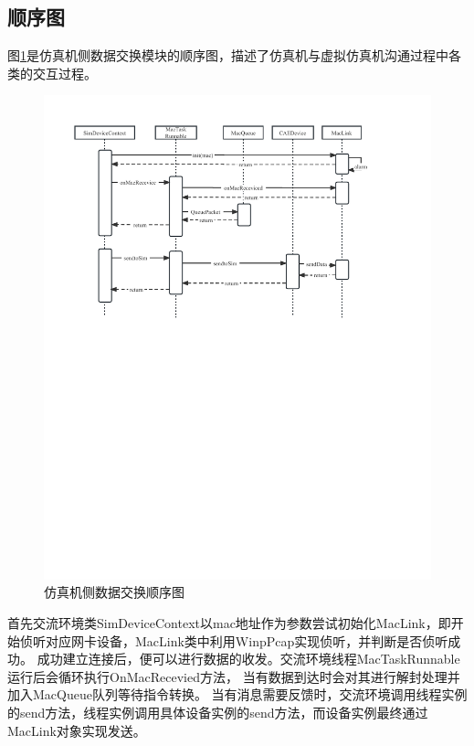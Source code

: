 \subsection{顺序图}
图\ref{seq1}是仿真机侧数据交换模块的顺序图，描述了仿真机与虚拟仿真机沟通过程中各类的交互过程。
\begin{figure}[h!]
    \begin{center}
        \includegraphics[width=\textwidth]{pictures/sequence1.pdf}
        \caption{仿真机侧数据交换顺序图}
        \label{seq1}
    \end{center}
\end{figure}
\vspace{7pt}
\par
首先交流环境类SimDeviceContext以mac地址作为参数尝试初始化MacLink，即开始侦听对应网卡设备，MacLink类中利用WinpPcap实现侦听，并判断是否侦听成功。
成功建立连接后，便可以进行数据的收发。交流环境线程MacTaskRunnable运行后会循环执行OnMacRecevied方法，
当有数据到达时会对其进行解封处理并加入MacQueue队列等待指令转换。
当有消息需要反馈时，交流环境调用线程实例的send方法，线程实例调用具体设备实例的send方法，而设备实例最终通过MacLink对象实现发送。

